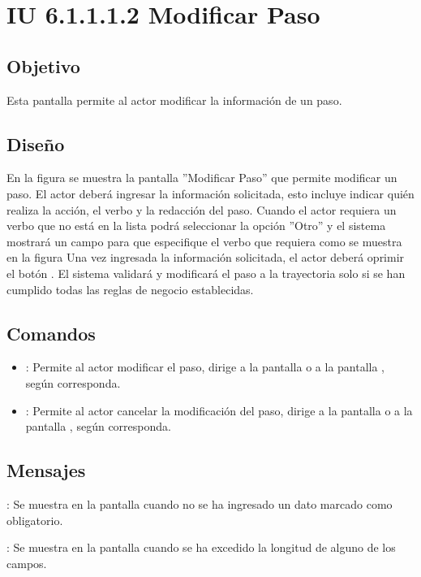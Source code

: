 \section{IU 6.1.1.1.2 Modificar Paso}

\subsection{Objetivo}
	Esta pantalla permite al actor modificar la información de un paso.
\subsection{Diseño}
	En la figura  se muestra la pantalla ''Modificar Paso'' que permite modificar un paso. El actor deberá ingresar la información solicitada, esto incluye indicar quién realiza la acción, el verbo y la redacción del paso.
	Cuando el actor requiera un verbo que no está en la lista podrá seleccionar la opción ''Otro'' y el sistema mostrará un campo para que especifique el verbo que requiera como se muestra en la figura 
	Una vez ingresada la información solicitada, el actor deberá oprimir el botón  . El sistema validará y modificará el paso a la trayectoria solo si se han cumplido todas las reglas de negocio establecidas.

\subsection{Comandos}
\begin{itemize}
	\item {}: Permite al actor modificar el paso, dirige a la pantalla  o a la pantalla , según corresponda.
	\item {}: Permite al actor cancelar la modificación del paso, dirige a la pantalla  o a la pantalla , según corresponda.
\end{itemize}

\subsection{Mensajes}

\begin{Citemize}
	\item {}: Se muestra en la pantalla  cuando no se ha ingresado un dato marcado como obligatorio.
	\item {}: Se muestra en la pantalla  cuando se ha excedido la longitud de alguno de los campos.
\end{Citemize}
